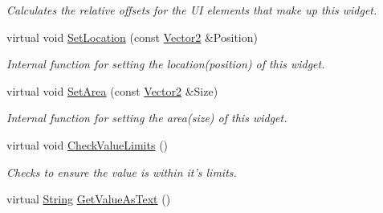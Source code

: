 \begin{DoxyCompactItemize}
\begin{DoxyCompactList}\small\item\em Calculates the relative offsets for the UI elements that make up this widget. \item\end{DoxyCompactList}\item 
\hypertarget{classphys_1_1UI_1_1Spinner_a27c0c8ab2d9dd70df0a2a4536718bbe8}{
virtual void \hyperlink{classphys_1_1UI_1_1Spinner_a27c0c8ab2d9dd70df0a2a4536718bbe8}{SetLocation} (const \hyperlink{classphys_1_1Vector2}{Vector2} \&Position)}
\label{d7/d81/classphys_1_1UI_1_1Spinner_a27c0c8ab2d9dd70df0a2a4536718bbe8}

\begin{DoxyCompactList}\small\item\em Internal function for setting the location(position) of this widget. \item\end{DoxyCompactList}\item 
\hypertarget{classphys_1_1UI_1_1Spinner_a79840ed511ddc21d4281dc145504916e}{
virtual void \hyperlink{classphys_1_1UI_1_1Spinner_a79840ed511ddc21d4281dc145504916e}{SetArea} (const \hyperlink{classphys_1_1Vector2}{Vector2} \&Size)}
\label{d7/d81/classphys_1_1UI_1_1Spinner_a79840ed511ddc21d4281dc145504916e}

\begin{DoxyCompactList}\small\item\em Internal function for setting the area(size) of this widget. \item\end{DoxyCompactList}\item 
\hypertarget{classphys_1_1UI_1_1Spinner_aa39b1f3c2b0ac1bfe6824f6423915918}{
virtual void \hyperlink{classphys_1_1UI_1_1Spinner_aa39b1f3c2b0ac1bfe6824f6423915918}{CheckValueLimits} ()}
\label{d7/d81/classphys_1_1UI_1_1Spinner_aa39b1f3c2b0ac1bfe6824f6423915918}

\begin{DoxyCompactList}\small\item\em Checks to ensure the value is within it's limits. \item\end{DoxyCompactList}\item 
\hypertarget{classphys_1_1UI_1_1Spinner_ac9cc6fde628120156d187b9d283579be}{
virtual \hyperlink{namespacephys_aa03900411993de7fbfec4789bc1d392e}{String} \hyperlink{classphys_1_1UI_1_1Spinner_ac9cc6fde628120156d187b9d283579be}{GetValueAsText} ()}
\label{d7/d81/classphys_1_1UI_1_1Spinner_ac9cc6fde628120156d187b9d283579be}


\end{DoxyCompactItemize}
